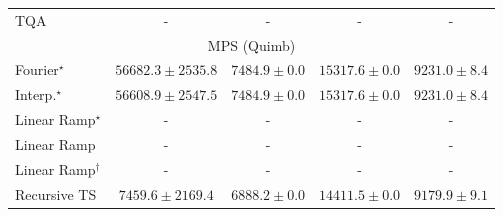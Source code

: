\begin{tabular}{l|cccc|}
TQA & {\cellcolor[HTML]{000000}} \color[HTML]{F1F1F1} {\cellcolor{white}} \color{black} - & {\cellcolor[HTML]{000000}} \color[HTML]{F1F1F1} {\cellcolor{white}} \color{black} - & {\cellcolor[HTML]{000000}} \color[HTML]{F1F1F1} {\cellcolor{white}} \color{black} - & {\cellcolor[HTML]{000000}} \color[HTML]{F1F1F1} {\cellcolor{white}} \color{black} - \\
\cline{1-5}
\multicolumn{5}{c}{\rule{0pt}{8pt}MPS (Quimb)} \\
\midrule
Fourier$^\star$ & {\cellcolor[HTML]{662506}} \color[HTML]{F1F1F1} $56682.3\pm 2535.8$ & {\cellcolor[HTML]{FFFEE1}} \color[HTML]{000000} $7484.9\pm 0.0$ & {\cellcolor[HTML]{FFF0AD}} \color[HTML]{000000} $15317.6\pm 0.0$ & {\cellcolor[HTML]{FFFCD6}} \color[HTML]{000000} $9231.0\pm 8.4$ \\
Interp.$^\star$ & {\cellcolor[HTML]{662506}} \color[HTML]{F1F1F1} $56608.9\pm 2547.5$ & {\cellcolor[HTML]{FFFEE1}} \color[HTML]{000000} $7484.9\pm 0.0$ & {\cellcolor[HTML]{FFF0AD}} \color[HTML]{000000} $15317.6\pm 0.0$ & {\cellcolor[HTML]{FFFCD6}} \color[HTML]{000000} $9231.0\pm 8.4$ \\
Linear Ramp$^\star$ & {\cellcolor[HTML]{000000}} \color[HTML]{F1F1F1} {\cellcolor{white}} \color{black} - & {\cellcolor[HTML]{000000}} \color[HTML]{F1F1F1} {\cellcolor{white}} \color{black} - & {\cellcolor[HTML]{000000}} \color[HTML]{F1F1F1} {\cellcolor{white}} \color{black} - & {\cellcolor[HTML]{000000}} \color[HTML]{F1F1F1} {\cellcolor{white}} \color{black} - \\
Linear Ramp & {\cellcolor[HTML]{000000}} \color[HTML]{F1F1F1} {\cellcolor{white}} \color{black} - & {\cellcolor[HTML]{000000}} \color[HTML]{F1F1F1} {\cellcolor{white}} \color{black} - & {\cellcolor[HTML]{000000}} \color[HTML]{F1F1F1} {\cellcolor{white}} \color{black} - & {\cellcolor[HTML]{000000}} \color[HTML]{F1F1F1} {\cellcolor{white}} \color{black} - \\
Linear Ramp$^\dagger$ & {\cellcolor[HTML]{000000}} \color[HTML]{F1F1F1} {\cellcolor{white}} \color{black} - & {\cellcolor[HTML]{000000}} \color[HTML]{F1F1F1} {\cellcolor{white}} \color{black} - & {\cellcolor[HTML]{000000}} \color[HTML]{F1F1F1} {\cellcolor{white}} \color{black} - & {\cellcolor[HTML]{000000}} \color[HTML]{F1F1F1} {\cellcolor{white}} \color{black} - \\
Recursive TS & {\cellcolor[HTML]{FFFEE2}} \color[HTML]{000000} $7459.6\pm 2169.4$ & {\cellcolor[HTML]{FFFFE5}} \color[HTML]{000000} $6888.2\pm 0.0$ & {\cellcolor[HTML]{FFF3B4}} \color[HTML]{000000} $14411.5\pm 0.0$ & {\cellcolor[HTML]{FFFCD7}} \color[HTML]{000000} $9179.9\pm 9.1$ \\

\end{tabular}
